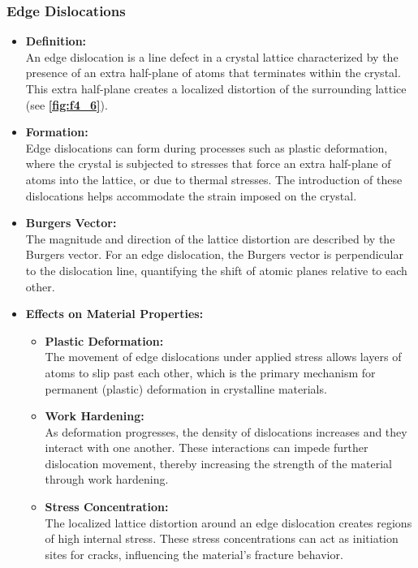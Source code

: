 \subsubsection{Edge Dislocations}
\begin{itemize}
  \item \textbf{Definition:} \\
    An edge dislocation is a line defect in a crystal lattice characterized by the presence of an extra half-plane of atoms that terminates within the crystal. This extra half-plane creates a localized distortion of the surrounding lattice (see \textbf{\autoref{fig:f4_6}}).
  \item \textbf{Formation:} \\
    Edge dislocations can form during processes such as plastic deformation, where the crystal is subjected to stresses that force an extra half-plane of atoms into the lattice, or due to thermal stresses. The introduction of these dislocations helps accommodate the strain imposed on the crystal.
  \item \textbf{Burgers Vector:} \\
    The magnitude and direction of the lattice distortion are described by the Burgers vector. For an edge dislocation, the Burgers vector is perpendicular to the dislocation line, quantifying the shift of atomic planes relative to each other.
  \item \textbf{Effects on Material Properties:}
    \begin{itemize}
      \item \textbf{Plastic Deformation:} \\
        The movement of edge dislocations under applied stress allows layers of atoms to slip past each other, which is the primary mechanism for permanent (plastic) deformation in crystalline materials.
      \item \textbf{Work Hardening:} \\
        As deformation progresses, the density of dislocations increases and they interact with one another. These interactions can impede further dislocation movement, thereby increasing the strength of the material through work hardening.
      \item \textbf{Stress Concentration:} \\
        The localized lattice distortion around an edge dislocation creates regions of high internal stress. These stress concentrations can act as initiation sites for cracks, influencing the material's fracture behavior.
    \end{itemize}
\end{itemize}

